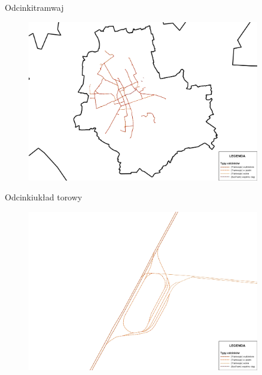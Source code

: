 \documentclass[8pt]{beamer}
\begin{document}
\begin{frame}{Odcinki}{tramwaj}
\begin{figure}
\begin{center}
\includegraphics[width=0.9\textwidth]{tram}
 \end{center}
  \end{figure} 
\end{frame}

\begin{frame}{Odcinki}{układ torowy}
\begin{figure}
\begin{center}
\includegraphics[width=0.9\textwidth]{tram2}
 \end{center}
  \end{figure} 
\end{frame}
\end{document}
